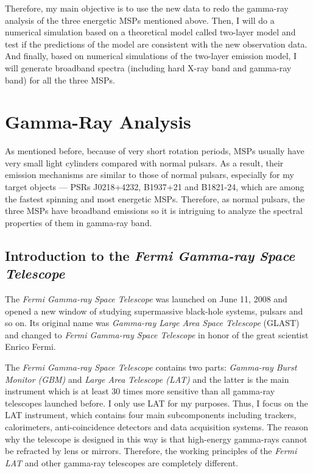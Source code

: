\documentclass[12pt]{report}
\begin{document}
    Therefore, my main objective is to use the new data to redo the gamma-ray
    analysis of the three energetic MSPs mentioned above. Then, I will do a numerical
    simulation based on a theoretical model called two-layer model and test if the  
    predictions of the model are consistent with the new observation data. And finally, 
    based on numerical simulations of the two-layer emission model, I will generate 
    broadband spectra (including hard X-ray band and gamma-ray band) for all the three MSPs. 

    
\chapter{Gamma-Ray Analysis}
  As mentioned before, because of very short rotation periods, MSPs usually have very small 
  light cylinders compared with normal pulsars. As a result, their emission mechanisms are 
  similar to those of normal pulsars, especially for my target objects --- PSRs J0218+4232, 
  B1937+21 and B1821-24, which are among the fastest spinning and most energetic MSPs. 
  Therefore, as normal pulsars, the three MSPs have broadband emissions so it is intriguing 
  to analyze the spectral properties of them in gamma-ray band.

  \section{Introduction to the \textit{Fermi Gamma-ray Space Telescope}}
    The \textit{Fermi Gamma-ray Space Telescope} was launched on June 11, 2008 and opened 
    a new window of studying supermassive black-hole systems, pulsars and so on. Its 
    original name was \textit{Gamma-ray Large Area Space Telescope} (GLAST) and changed 
    to \textit{Fermi Gamma-ray Space Telescope} in honor of the great scientist Enrico Fermi. 

    The \textit{Fermi Gamma-ray Space Telescope} contains two parts: 
    \textit{Gamma-ray Burst Monitor (GBM)} and \textit{Large Area Telescope (LAT)} and the 
    latter is the main instrument which is at least 30 times more sensitive than 
    all gamma-ray telescopes launched before. I only use LAT for my purposes. Thus, I 
    focus on the LAT instrument, which contains four main subcomponents including trackers, 
    calorimeters, anti-coincidence detectors and data acquisition systems. The reason why the 
    telescope is designed in this way is that high-energy gamma-rays cannot be refracted by
    lens or mirrors. Therefore, the working principles of the \textit{Fermi LAT} and other 
    gamma-ray telescopes are completely different.
\end{document}
